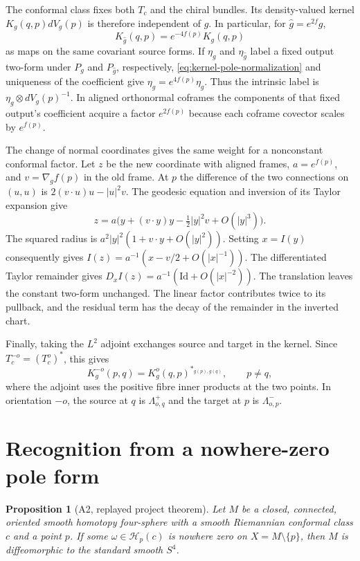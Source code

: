 \documentclass[11pt,letterpaper]{article}
\numberwithin{equation}{section}
\newtheorem{proposition}{Proposition}[section]
\begin{document}
The conformal class fixes both \(T_c\) and the chiral bundles. Its
density-valued kernel \(K_g(q,p)dV_g(p)\) is therefore independent of
\(g\). In particular, for \(\widehat g=e^{2f}g\),
\[
 K_{\widehat g}(q,p)=e^{-4f(p)}K_g(q,p)
\]
as maps on the same covariant source forms. If \(\eta_g\) and
\(\eta_{\widehat g}\) label a fixed output two-form under
\(P_g\) and \(P_{\widehat g}\), respectively,
\eqref{eq:kernel-pole-normalization} and uniqueness of the coefficient
give \(\eta_{\widehat g}=e^{4f(p)}\eta_g\). Thus the intrinsic label is
\(\eta_g\otimes dV_g(p)^{-1}\). In aligned orthonormal coframes the
components of that fixed output's coefficient acquire a factor
\(e^{2f(p)}\) because each coframe covector scales by \(e^{f(p)}\).

The change of normal coordinates gives the same weight for a
nonconstant conformal factor. Let \(z\) be the new coordinate with
aligned frames, \(a=e^{f(p)}\), and \(v=\nabla_g f(p)\) in the old
frame. At \(p\) the difference of the two connections on \((u,u)\) is
\(2(v\cdot u)u-|u|^2v\). The geodesic equation and inversion of its
Taylor expansion give
\[
 z=a\bigl(y+(v\cdot y)y-\tfrac12|y|^2v+O(|y|^3)\bigr).
\]
The squared radius is
\(a^2|y|^2(1+v\cdot y+O(|y|^2))\). Setting \(x=I(y)\) consequently
gives \(I(z)=a^{-1}(x-v/2+O(|x|^{-1}))\). The differentiated Taylor
remainder gives \(D_xI(z)=a^{-1}(\mathrm{Id}+O(|x|^{-2}))\).
The translation leaves the constant two-form unchanged. The linear
factor contributes twice to its pullback, and the residual term has
the decay of the remainder in the inverted chart.

Finally, taking the \(L^2\) adjoint exchanges source and target in the
kernel. Since \(T_c^{-o}=(T_c^o)^*\), this gives
\begin{equation}\label{eq:kernel-orientation-reciprocity}
 K_g^{-o}(p,q)=K_g^o(q,p)^{*_{g(p),g(q)}},\qquad p\ne q,
\end{equation}
where the adjoint uses the positive fibre inner products at the two
points. In orientation \(-o\), the source at \(q\) is
\(\Lambda^+_{o,q}\) and the target at \(p\) is \(\Lambda^-_{o,p}\).

\section{Recognition from a nowhere-zero pole form}

\begin{proposition}[A2, replayed project theorem]\label{prop:recognition-pole}
Let \(M\) be a closed, connected, oriented smooth homotopy four-sphere
with a smooth Riemannian conformal class \(c\) and a point \(p\).
If some \(\omega\in\mathcal H_p(c)\) is nowhere zero on
\(X=M\setminus\{p\}\), then \(M\) is diffeomorphic to the standard
smooth \(S^4\).
\end{proposition}
\end{document}

